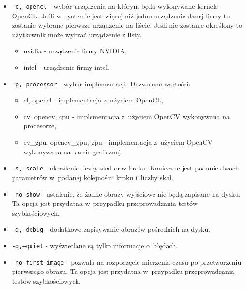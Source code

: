\begin{itemize}
\item \texttt{-c,--opencl} - wybór urządzenia na którym będą wykonywane kernele OpenCL. Jeśli w~systemie jest więcej niż jedno urządzenie danej firmy to zostanie wybrane pierwsze urządzenie na liście. Jeśli nie zostanie określony to użytkownik może wybrać urządzenie z listy.
	\begin{itemize}
		\item nvidia - urządzenie firmy NVIDIA,
        \item intel - urządzenie firmy intel.
	\end{itemize}
\item \texttt{-p,--processor} - wybór implementacji. Dozwolone wartości:
	\begin{itemize}
		\item cl, opencl - implementacja z~użyciem OpenCL,
        \item cv, opencv, cpu - implementacja z~użyciem OpenCV wykonywana na procesorze,
        \item cv\_gpu, opencv\_gpu, gpu - implementacja z~użyciem OpenCV wykonywana na karcie graficznej.
	\end{itemize}
\item \texttt{-s,--scale} - określenie liczby skal oraz kroku. Konieczne jest podanie dwóch parametrów w~podanej kolejności: kroku i~liczby skal.
\item \texttt{--no-show} - ustalenie, że żadne obrazy wyjściowe nie będą zapisane na dysku. Ta opcja jest przydatna w~przypadku przeprowadzania testów szybkościowych.
\item \texttt{-d,--debug} - dodatkowe zapisywanie obrazów pośrednich na dysku.
\item \texttt{-q,--quiet} - wyświetlane są tylko informacje o~błędach.
\item \texttt{--no-first-image} - pozwala na rozpoczęcie mierzenia czasu po przetworzeniu pierwszego obrazu. Ta opcja jest przydatna w~przypadku przeprowadzania testów szybkościowych.
\end{itemize}